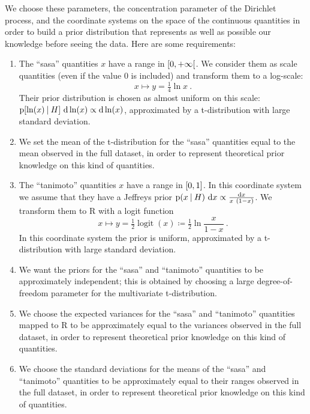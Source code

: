 \documentclass[\ifafour a4paper,12pt,\else a5paper,10pt,\fi%
onecolumn,oneside,article,%
british%
]{memoir}
\theoremstyle{remark}
\theoremstyle{innote}
\newcommand*{\di}{\mathrm{d}}%
\newcommand*{\RR}{\bm{\mathrm{R}}}
\newcommand*{\defd}{\coloneqq}
\DeclarePairedDelimiter\clcl{[}{]}
\DeclarePairedDelimiter\clop{[}{[}
\newcommand*{\p}{\mathrm{p}}%
\renewcommand*{\|}[1][]{\nonscript\:#1\vert\nonscript\:\mathopen{}}
\renewcommand*{\=}{\TextOrMath\texteq\eq}
\DeclareMathOperator*{\logit}{logit}
\begin{document}
We choose these parameters, the concentration parameter of the Dirichlet
process, and the coordinate systems on the space of the continuous
quantities in order to build a prior distribution that represents as well
as possible our knowledge before seeing the data. Here are some
requirements:
\begin{enumerate}[label=(\alph*)]
\item The \enquote{sasa} quantities $x$ have a range in $\clop{0,+\infty}$.
  We consider them as scale quantities (even if the value $0$ is included)
  and transform them to a log-scale:
    \begin{equation}
    \label{eq:log_sasa}
    x \mapsto y = \tfrac{1}{4}\ln x \ .
  \end{equation}
  Their prior distribution is chosen as almost uniform on this scale:
  $\p[\ln(x) \| H]\ \di\ln(x) \propto \di\ln(x)$, approximated by a
  t-distribution with large standard deviation.

\item We set the mean of the t-distribution for the \enquote{sasa}
  quantities equal to the mean observed in the full dataset, in order to represent
  theoretical prior knowledge on this kind of quantities.

\item The \enquote{tanimoto} quantities $x$ have a range in $\clcl{0,1}$.
  In this coordinate system we assume that they have a Jeffreys prior $\p(x
  \| H)\ \di x \propto \frac{\di x}{x\ (1-x)}$.
  We transform them to $\RR$ with a logit function
  \begin{equation}
    \label{eq:logit_tanimoto}
    x \mapsto y = \tfrac{1}{2}\logit(x) \defd \tfrac{1}{2}\ln\frac{x}{1-x} \ .
  \end{equation}
In this coordinate system the prior is uniform, approximated by a
t-distribution with large standard deviation.

\item We want the priors for the \enquote{sasa} and \enquote{tanimoto}
  quantities to be approximately independent; this is obtained by choosing
  a large degree-of-freedom parameter for the multivariate t-distribution.
\item We choose the expected variances for the \enquote{sasa} and
  \enquote{tanimoto} quantities mapped to $\RR$ to be approximately equal
  to the variances observed in the full dataset, in order to represent
  theoretical prior knowledge on this kind of quantities.
\item We choose the standard deviations for the means of the \enquote{sasa}
  and \enquote{tanimoto} quantities to be approximately equal to their
  ranges observed in the full dataset, in order to represent theoretical
  prior knowledge on this kind of quantities.
\end{enumerate}
\end{document}
